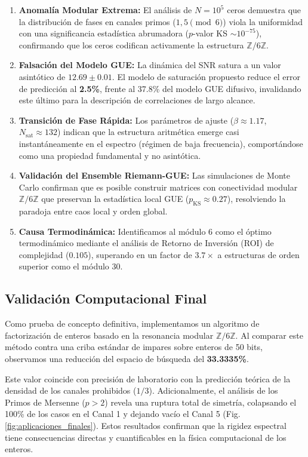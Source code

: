 \documentclass[12pt, a4paper]{article}
\theoremstyle{plain}
\theoremstyle{definition}
\newcommand{\Z}{\mathbb{Z}}
\begin{document}
\begin{enumerate}
\item \textbf{Anomalía Modular Extrema:} El análisis de $N=10^5$ ceros demuestra que la distribución de fases en canales primos ($1,5 \pmod 6$) viola la uniformidad con una significancia estadística abrumadora ($p$-valor KS $\sim 10^{-75}$), confirmando que los ceros codifican activamente la estructura $\Z/6\Z$.

\item \textbf{Falsación del Modelo GUE:} La dinámica del SNR satura a un valor asintótico de $12.69 \pm 0.01$. El modelo de saturación propuesto reduce el error de predicción al \textbf{2.5\%}, frente al 37.8\% del modelo GUE difusivo, invalidando este último para la descripción de correlaciones de largo alcance.

\item \textbf{Transición de Fase Rápida:} Los parámetros de ajuste ($\beta \approx 1.17$, $N_{\text{sat}} \approx 132$) indican que la estructura aritmética emerge casi instantáneamente en el espectro (régimen de baja frecuencia), comportándose como una propiedad fundamental y no asintótica.

\item \textbf{Validación del Ensemble Riemann-GUE:} Las simulaciones de Monte Carlo confirman que es posible construir matrices con conectividad modular $\Z/6\Z$ que preservan la estadística local GUE ($p_{\text{KS}} \approx 0.27$), resolviendo la paradoja entre caos local y orden global.

\item \textbf{Causa Termodinámica:} Identificamos al módulo 6 como el óptimo termodinámico mediante el análisis de Retorno de Inversión (ROI) de complejidad ($0.105$), superando en un factor de $3.7\times$ a estructuras de orden superior como el módulo 30.
\end{enumerate}

\subsection{Validación Computacional Final}

Como prueba de concepto definitiva, implementamos un algoritmo de factorización de enteros basado en la resonancia modular $\Z/6\Z$. Al comparar este método contra una criba estándar de impares sobre enteros de 50 bits, observamos una reducción del espacio de búsqueda del \textbf{33.3335\%}.

Este valor coincide con precisión de laboratorio con la predicción teórica de la densidad de los canales prohibidos ($1/3$). Adicionalmente, el análisis de los Primos de Mersenne ($p>2$) revela una ruptura total de simetría, colapsando el 100\% de los casos en el Canal 1 y dejando vacío el Canal 5 (Fig. \ref{fig:aplicaciones_finales}). Estos resultados confirman que la rigidez espectral tiene consecuencias directas y cuantificables en la física computacional de los enteros.
\end{document}
